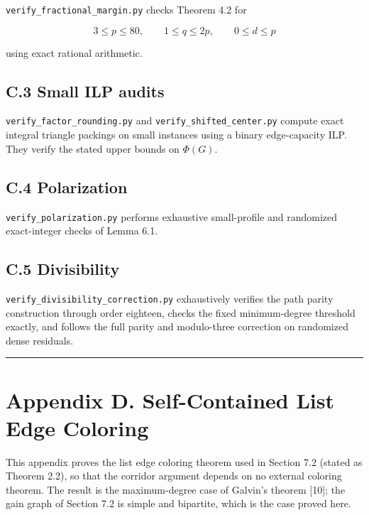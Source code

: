 \documentclass[
  american,
  11pt,
  a4paper,
]{article}
\begin{document}
\texttt{verify\_fractional\_margin.py} checks Theorem 4.2 for

\[
3\le p\le80,
\qquad
1\le q\le2p,
\qquad
0\le d\le p
\]

using exact rational arithmetic.

\subsection{C.3 Small ILP audits}\label{c.3-small-ilp-audits}

\texttt{verify\_factor\_rounding.py} and \texttt{verify\_shifted\_center.py} compute exact integral triangle packings on small instances using a binary edge-capacity ILP. They verify the stated upper bounds on \(\Phi(G)\).

\subsection{C.4 Polarization}\label{c.4-polarization}

\texttt{verify\_polarization.py} performs exhaustive small-profile and randomized exact-integer checks of Lemma 6.1.

\subsection{C.5 Divisibility}\label{c.5-divisibility}

\texttt{verify\_divisibility\_correction.py} exhaustively verifies the path parity construction through order eighteen, checks the fixed minimum-degree threshold exactly, and follows the full parity and modulo-three correction on randomized dense residuals.

\begin{center}\rule{0.5\linewidth}{0.5pt}\end{center}

\section{Appendix D. Self-Contained List Edge Coloring}\label{appendix-d.-self-contained-list-edge-coloring}

This appendix proves the list edge coloring theorem used in Section 7.2 (stated as Theorem 2.2), so that the corridor argument depends on no external coloring theorem. The result is the maximum-degree case of Galvin's theorem {[}10{]}; the gain graph of Section 7.2 is simple and bipartite, which is the case proved here.
\end{document}
